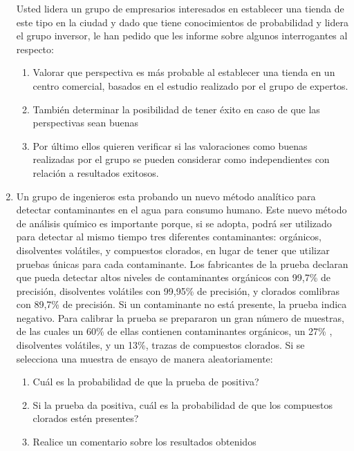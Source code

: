 \documentclass[base=hide,12pt]{elegantbook}
\begin{document}
\begin{enumerate}
Usted lidera un grupo de empresarios interesados en establecer una tienda de este tipo en la ciudad y dado que tiene conocimientos de probabilidad y lidera el grupo inversor, le han pedido que les informe sobre algunos interrogantes al  respecto:
\begin{enumerate}
	\item Valorar que perspectiva es más probable al establecer una tienda en un centro comercial, basados en el estudio realizado por el grupo de expertos.
	\item También determinar la posibilidad de tener éxito en caso de que las perspectivas sean buenas
	\item Por último ellos quieren verificar si las valoraciones como buenas realizadas por el grupo se pueden considerar como independientes con relación a resultados exitosos. 
\end{enumerate}
\item Un grupo de ingenieros esta probando un nuevo método analítico para detectar contaminantes
en el agua para consumo humano. Este nuevo método de análisis químico es importante porque, si se adopta, podrá ser utilizado para detectar al mismo tiempo tres diferentes contaminantes: orgánicos, disolventes volátiles, y compuestos clorados, en lugar de tener que utilizar pruebas únicas para cada contaminante. Los fabricantes de la prueba declaran que pueda detectar altos niveles de contaminantes orgánicos con 99,7\% de precisión, disolventes volátiles con 99,95\% de precisión, y clorados comlibras con 89,7\% de precisión. Si un contaminante no está presente, la prueba indica negativo. Para calibrar la prueba se prepararon un gran número de
muestras, de las cuales un 60\% de ellas contienen contaminantes orgánicos, un 27\% , disolventes volátiles, y un 13\%, trazas de compuestos clorados. Si se selecciona una muestra de ensayo de manera aleatoriamente: 
\begin{enumerate}
\item  Cuál es la probabilidad de que la prueba de positiva? 
\item Si la prueba da positiva, cuál es la probabilidad de que los compuestos clorados estén presentes?
\item Realice un comentario sobre los resultados obtenidos
\end{enumerate}



\end{enumerate}
\end{document}
